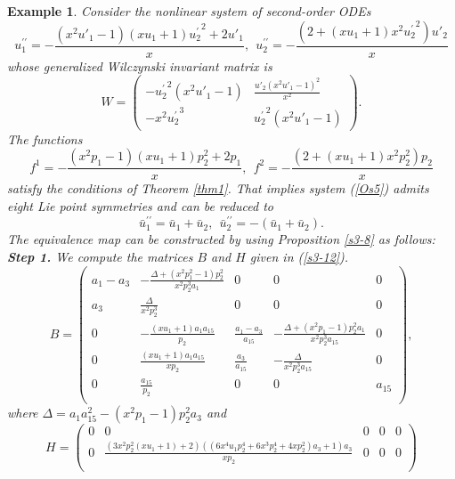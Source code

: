\documentclass[12pt]{article}
\newtheorem{example}[theorem]{Example}
\begin{document}
\begin{example}
 Consider the nonlinear system of second-order ODEs
\begin{equation}\label{Os5}
u_1^{\prime\prime}=-\frac{(x^2u'_1-1)(xu_1+1){u^{'}_2}^{2}+2u'_1}{x},~~u_2^{\prime\prime}=-\frac{(2+(xu_1+1)x^2{u^{'}_2}^{2})u'_2}{x}
 \end{equation}
whose generalized Wilczynski invariant matrix is
\begin{equation}
W=\begin{pmatrix}
-{u^{'}_2}^{2}(x^2u'_1-1)&\frac{u'_2(x^2u'_1-1)^2}{x^2}\\
-x^2{u^{'}_2}^{3}&{u^{'}_2}^{2}(x^2u'_1-1)
\end{pmatrix}.
\end{equation}
The functions
\begin{equation}\label{Os8}
 f^1=-\frac{(x^2p_1-1)(xu_1+1)p^{2}_2+2p_1}{x},~~f^2=-\frac{(2+(xu_1+1)x^2p^{2}_2)p_2}{x}
\end{equation}
 satisfy the conditions of Theorem \ref{thm1}. That implies system (\ref{Os5}) admits eight Lie point symmetries and can be reduced to
\begin{equation}
\bar{u}_1^{\prime\prime}=\bar{u}_1+\bar{u}_2,~~\bar{u}_2^{\prime\prime}=-(\bar{u}_1+\bar{u}_2).
\end{equation}
The equivalence map can be constructed by using Proposition \ref{s3-8} as follows:
 \textbf{Step 1.} We compute the matrices $B$ and $H$ given in (\ref{s3-12}). \\
\begin{equation}\label{OE10}
B=\begin{pmatrix}
a_1-a_3&-\frac{\Delta+(x^2p_1^2-1)p_2^2}{x^2p_2^3a_1}&0&0&0\\
a_3&\frac{\Delta}{x^2p_2^3}&0&0&0\\
0&-\frac{(xu_1+1)a_1a_{15}}{p_2}&\frac{a_1-a_3}{a_{15}}&-\frac{\Delta+(x^2p_1-1)p_2^2a_1}{x^2p_2^3a_{15}}&0\\
0&\frac{(xu_1+1)a_1a_{15}}{xp_2}&\frac{a_3}{a_{15}}&-\frac{\Delta}{x^2p_2^3a_{15}}&0\\
0&\frac{a_{15}}{p_2}&0&0&a_{15}\\
\end{pmatrix},
\end{equation}
where $\Delta=a_1a_{15}^2-(x^2p_1-1)p_2^2a_3$ and\begin{equation}\label{Os3-13}
H=\begin{pmatrix}
0&0&0&0&0\\
0&\frac{(3x^2p_2^2(xu_1+1)+2)((6x^4u_1p_2^4+6x^3p_2^4+4xp_2^2)a_3+1)a_3}{xp_2}&0&0&0\\

\end{pmatrix}
\end{equation}
\end{example}
\end{document}
